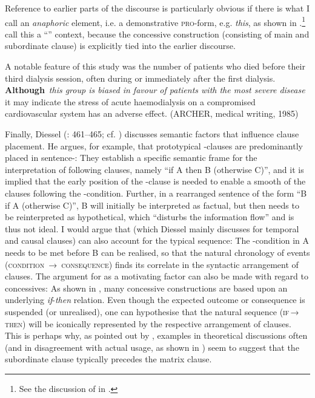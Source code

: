 Reference to earlier parts of the discourse is particularly obvious if there is what I call an \textit{anaphoric} element, i.e. a demonstrative \textsc{pro}-form, e.g. \textit{this}, as shown in .\footnote{See the discussion of \citet{WiechmannKerz2013} in .}    \citet[6]{WiechmannKerz2013} call this a “” context, because the concessive construction (consisting of main and subordinate clause) is explicitly tied into the earlier discourse.

\eanoraggedright\label{ex:30}   \label{bkm:Ref490744512}A notable feature of this study was the number of patients who died before their third dialysis session, often during or immediately after the first dialysis. \textbf{Although}~\textit{this group is biased in favour of patients with the most severe disease} it may indicate the stress of acute haemodialysis on a compromised cardiovascular system has an adverse effect. (ARCHER, medical writing, 1985)
\z

Finally, Diessel (\citeyear{Diessel2005}: 461–465; cf. \citealt{Diessel2008}) discusses semantic factors that influence clause placement. He argues, for example, that prototypical -clauses are predominantly placed in sentence-: They establish a specific semantic frame for the interpretation of following clauses, namely “if A then B (otherwise C)”, and it is implied that the early position of the -clause is needed to enable a smooth  of the clauses following the -condition. Further, in a rearranged sentence of the form “B if A (otherwise C)”, B will initially be interpreted as factual, but then needs to be reinterpreted as hypothetical, which “disturbs the information flow” \citep[462]{Diessel2005} and is thus not ideal. I would argue that  (which Diessel mainly discusses for temporal and causal clauses) can also account for the typical sequence: The -condition in A needs to be met before B can be realised, so that the natural chronology of events (\textsc{condition~}→~\textsc{consequence}) finds its correlate in the syntactic arrangement of clauses. The argument for  as a motivating factor can also be made with regard to concessives: As shown in , many concessive constructions are based upon an underlying \textit{if}-\textit{then} relation. Even though the expected outcome or consequence is suspended (or unrealised), one can hypothesise that the natural sequence (\textsc{if}\,→\,\textsc{then}) will be iconically represented by the respective arrangement of clauses. This is perhaps why, as pointed out by \citet[232]{Rudolph1996}, examples in theoretical discussions often (and in disagreement with actual usage, as shown in ) seem to suggest that the subordinate clause typically precedes the matrix clause.

